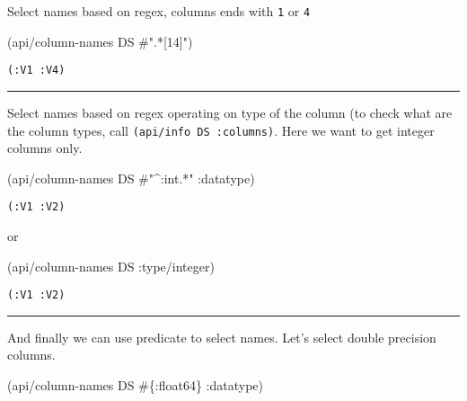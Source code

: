 \documentclass[]{article}
\newenvironment{Shaded}{\begin{snugshade}}{\end{snugshade}}
\newcommand{\AttributeTok}[1]{\textcolor[rgb]{0.77,0.63,0.00}{#1}}
\newcommand{\NormalTok}[1]{#1}
\newcommand{\SpecialStringTok}[1]{\textcolor[rgb]{0.31,0.60,0.02}{#1}}
\begin{document}
Select names based on regex, columns ends with \texttt{1} or \texttt{4}

\begin{Shaded}
\begin{Highlighting}[]
\NormalTok{(api/column-names DS }\SpecialStringTok{#".*[14]"}\NormalTok{)}
\end{Highlighting}
\end{Shaded}

\begin{verbatim}
(:V1 :V4)
\end{verbatim}

\begin{center}\rule{0.5\linewidth}{0.5pt}\end{center}

Select names based on regex operating on type of the column (to check
what are the column types, call \texttt{(api/info\ DS\ :columns)}. Here
we want to get integer columns only.

\begin{Shaded}
\begin{Highlighting}[]
\NormalTok{(api/column-names DS }\SpecialStringTok{#"^:int.*"} \AttributeTok{:datatype}\NormalTok{)}
\end{Highlighting}
\end{Shaded}

\begin{verbatim}
(:V1 :V2)
\end{verbatim}

or

\begin{Shaded}
\begin{Highlighting}[]
\NormalTok{(api/column-names DS }\AttributeTok{:type/integer}\NormalTok{)}
\end{Highlighting}
\end{Shaded}

\begin{verbatim}
(:V1 :V2)
\end{verbatim}

\begin{center}\rule{0.5\linewidth}{0.5pt}\end{center}

And finally we can use predicate to select names. Let's select double
precision columns.

\begin{Shaded}
\begin{Highlighting}[]
\NormalTok{(api/column-names DS #\{}\AttributeTok{:float64}\NormalTok{\} }\AttributeTok{:datatype}\NormalTok{)}
\end{Highlighting}
\end{Shaded}
\end{document}
